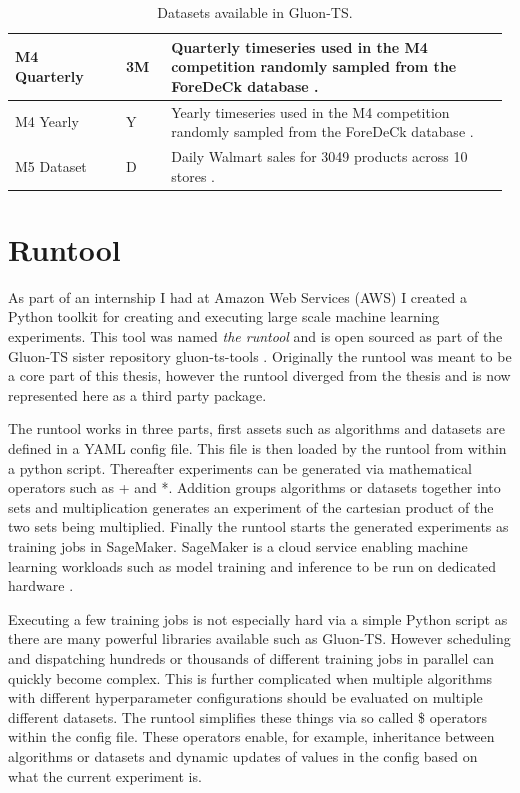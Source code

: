 \begin{table}[h]
\begin{tabular}{p{0.22\linewidth} | p{0.09\linewidth} | p{0.67\linewidth}}
    \hline
    M4 Quarterly       & 3M     & Quarterly timeseries used in the M4 competition randomly sampled from the ForeDeCk database \cite{makridakis_m4_2020}.                                                                                                                                             \\
    \hline
    M4 Yearly          & Y      & Yearly timeseries used in the M4 competition randomly sampled from the ForeDeCk database \cite{makridakis_m4_2020}.                                                                                                                                                \\
    \hline
    M5 Dataset         & D      & Daily Walmart sales for 3049 products across 10 stores \cite{gluonts-github, m5}.
  \end{tabular}
  \caption{Datasets available in Gluon-TS.}
  \label{tab:datasets}
\end{table}
\clearpage
\section{Runtool}
\label{subsec:runtool}

As part of an internship I had at Amazon Web Services (AWS) I created a Python toolkit for creating and executing large scale machine learning experiments. This tool was named \textit{the runtool} and is open sourced as part of the Gluon-TS sister repository gluon-ts-tools \cite{the_runtool}. Originally the runtool was meant to be a core part of this thesis, however the runtool diverged from the thesis and is now represented here as a third party package.

The runtool works in three parts, first assets such as algorithms and datasets are defined in a YAML config file. This file is then loaded by the runtool from within a python script. Thereafter experiments can be generated via mathematical operators such as + and *. Addition groups algorithms or datasets together into sets and multiplication generates an experiment of the cartesian product of the two sets being multiplied. Finally the runtool starts the generated experiments as training jobs in SageMaker. SageMaker is a cloud service enabling machine learning workloads such as model training and inference to be run on dedicated hardware \cite{sagemaker_website}.

Executing a few training jobs is not especially hard via a simple Python script as there are many powerful libraries available such as Gluon-TS. However scheduling and dispatching hundreds or thousands of different training jobs in parallel can quickly become complex. This is further complicated when multiple algorithms with different hyperparameter configurations should be evaluated on multiple different datasets. The runtool simplifies these things via so called \$ operators within the config file. These operators enable, for example, inheritance between algorithms or datasets and dynamic updates of values in the config based on what the current experiment is.

